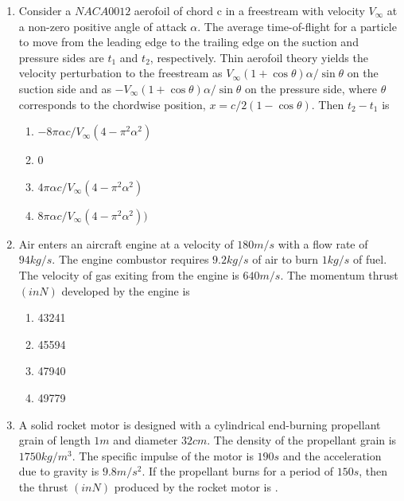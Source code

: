 \documentclass{article}
\begin{document}
\begin{enumerate}
\item Consider a $NACA 0012$ aerofoil of chord c in a freestream with velocity $V_\infty$ at a non-zero positive angle of attack $\alpha$. The average time-of-flight for a particle to move from the leading edge to the trailing edge on the suction and pressure sides are $t_1$ and $t_2$, respectively. Thin aerofoil theory yields the velocity perturbation to the freestream as $V_\infty(1+\cos\theta)\alpha/\sin\theta$ on the suction side and as $-V_\infty(1+\cos\theta)\alpha/\sin\theta$ on the pressure side, where $\theta$ corresponds to the chordwise position, $x = c/2(1-\cos\theta)$. Then $t_2 - t_1$ is

\begin{multicols}{4}
\begin{enumerate}
\item $-8\pi\alpha c/V_\infty(4-\pi^2\alpha^2)$
\item 0
\item $4\pi\alpha c/V_\infty(4-\pi^2\alpha^2)$
\item $8\pi\alpha c/V_\infty(4-\pi^2\alpha^2))$ 
\end{enumerate}
\end{multicols}

\item Air enters an aircraft engine at a velocity of $180 m/s$ with a flow rate of $94 kg/s$. The engine combustor requires $9.2 kg/s$ of air to burn $1 kg/s$ of fuel. The velocity of gas exiting from the engine is $640 m/s$. The momentum thrust $(in N)$ developed by the engine is

\begin{multicols}{4}
\begin{enumerate}
\item 43241
\item 45594
\item 47940
\item 49779
\end{enumerate}
\end{multicols}

\item A solid rocket motor is designed with a cylindrical end-burning propellant grain of length $1 m$ and diameter $32 cm$. The density of the propellant grain is $1750 kg/m^3$. The specific impulse of the motor is $190 s$ and the acceleration due to gravity is $9.8 m/s^2$. If the propellant burns for a period of $150 s$, then the thrust $(in N)$ produced by the rocket motor is \underline{\hspace{2cm}}.



\end{enumerate}
\end{document}
